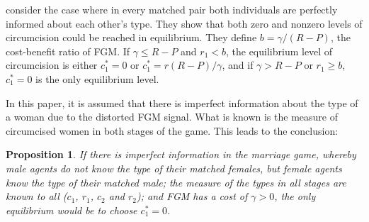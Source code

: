 \documentclass[12pt]{article}
\newtheorem{prop}{Proposition}
\begin{document}
\cite{Chesnokova2007} consider the case where in every matched pair both individuals are perfectly informed about each other's type.  They show that both zero and nonzero levels of circumcision could be reached in equilibrium.  They define $b = \gamma/(R - P)$, the cost-benefit ratio of FGM. If $\gamma \leq R - P$ and $r_1 < b$, the equilibrium level of circumcision is either $c_1^* = 0$ or $c_1^* = r(R-P)/\gamma$, and if $\gamma > R - P$ or $r_1 \geq b$, $c_1^* = 0$ is the only equilibrium level.

In this paper, it is assumed that there is imperfect information about the type of a woman due to the distorted FGM signal.  What is known is the measure of circumcised women in both stages of the game.  This leads to the conclusion:

\begin{prop}
  If there is imperfect information in the marriage game, whereby male agents do not know the type of their matched females, but female agents know the type of their matched male; the measure of the types in all stages are known to all ($c_1$, $r_1$, $c_2$ and $r_2$); and FGM has a cost of $\gamma > 0$, the only equilibrium would be to choose $c_1^* = 0$.
\end{prop}
\end{document}
